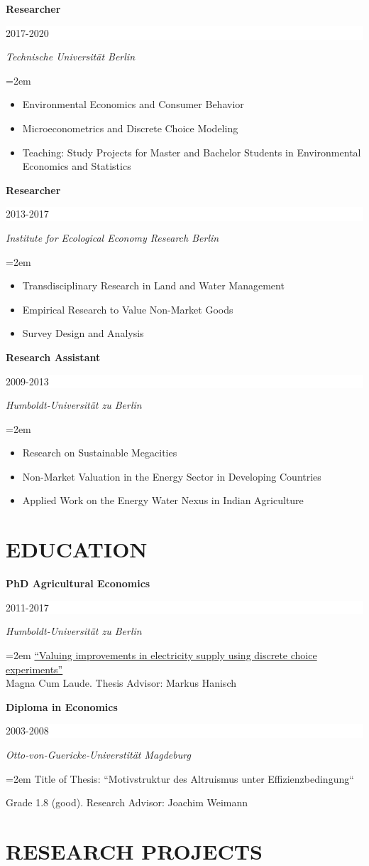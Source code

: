 \documentclass[paper=a4,fontsize=11pt]{scrartcl} %
\newcommand{\sepspace}{\vspace*{1em}}		%
\newcommand{\NewPart}[2]{\section*{\uppercase{#1} #2}}
\newcommand{\EducationEntry}[4]{
		\noindent \textbf{#1} \hfill      %
		\colorbox{White}{%
			\parbox{6em}{%
			\hfill\color{Black}#2}} \par  %
		\noindent \textit{#3} \par        %
		\noindent\hangindent=2em\hangafter=0 \small #4 %
		\normalsize \par}
\begin{document}
\EducationEntry{Researcher}{2017-2020}{Technische Universität Berlin}
{\begin{itemize}
\item{Environmental Economics and Consumer Behavior}
\item{Microeconometrics and Discrete Choice Modeling}
\item{Teaching: Study Projects for Master and Bachelor Students in Environmental Economics and Statistics}
\end{itemize}}
\sepspace

\EducationEntry{Researcher}{2013-2017}{Institute for Ecological Economy Research Berlin}{\begin{itemize}\item{Transdisciplinary Research in Land and Water Management} \item{Empirical Research to Value Non-Market Goods} \item{Survey Design and Analysis}\end{itemize}}
\sepspace
\EducationEntry{Research Assistant}{2009-2013}{Humboldt-Universität zu Berlin}
{\begin{itemize}\item{Research on Sustainable Megacities} \item {Non-Market Valuation in the Energy Sector in Developing Countries} \item{Applied Work on the Energy Water Nexus in Indian Agriculture}\end{itemize}}


\sepspace
\NewPart{Education}{}

\EducationEntry{PhD Agricultural Economics}{2011-2017}{Humboldt-Universität zu Berlin}{\href{https://edoc.hu-berlin.de/handle/18452/18406?locale-attribute=en}{``Valuing improvements in electricity supply using discrete choice experiments''}\\
Magna Cum Laude. Thesis Advisor: Markus Hanisch}
\sepspace

\EducationEntry{Diploma in Economics}{2003-2008}{Otto-von-Guericke-Universtität Magdeburg}{Title of Thesis: ``Motivstruktur des Altruismus unter Effizienzbedingung``}{Grade 1.8 (good). Research Advisor: Joachim Weimann}





\NewPart{Research Projects}{}
\end{document}
